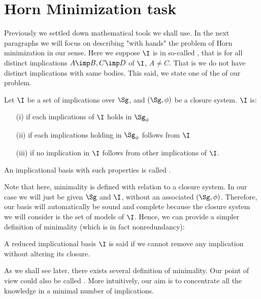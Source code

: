 \section{Horn Minimization task}

Previously we settled down mathematical tools we shall use. In the next 
paragraphs we will focus on describing "with hands" the problem of Horn 
minimization in our sense. Here we suppose $\I$ is in so-called , that is for all distinct implications $A \imp B, C \imp D$ of $\I$,
$A \neq C$. That is we do not have distinct implications with same bodies. This
said, we state one of the  of our problem.

\begin{definition} Let $\I$ be a set of 
implications over $\Sg$, and $(\Sg, \phi)$ be a closure system. $\I$ is:
\begin{itemize}
	\item[(i)]  if each implications of $\I$ holds in 
	$\Sg_\phi$
	\item[(ii)]  if each implications holding in 
	$\Sg_\phi$ follows from $\I$
	\item[(iii)]  if no implication in $\I$ follows 
	from other implications of $\I$.
\end{itemize}
\noindent An implicational basis with such properties is called 
.
\end{definition}

Note that here, minimality is defined with relation to a closure system. In
our case we will just be given $\Sg$ and $\I$, without an associated $(\Sg, 
\phi)$. Therefore, our basis will automatically be sound and complete because
the closure system we will consider is the set of models of $\I$. Hence, we
can provide a simpler definition of minimality (which is in fact nonredundancy):

\begin{definition} A reduced implicational basis $\I$ is
said  if we cannot remove any implication without altering
its closure.
	
\end{definition}


As we shall see later, there exists several definition of minimality. Our 
point of view could also be called . More intuitively, 
our aim is to concentrate all the knowledge in a minimal number of implications.

